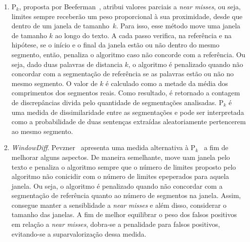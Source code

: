 \begin{enumerate}

%

\item P$_k$, proposta por Beeferman~\cite{Beeferman1999}, 
atribui valores parciais a \textit{near misses}, ou seja, limites sempre receberão um peso proporcional à sua proximidade, desde que dentro de um janela de tamanho~$k$.
%
Para isso, esse método move uma janela de tamanho $k$ ao longo do texto. 
%
A cada passo verifica, na referência e na hipótese, se o início e o final da janela estão ou não dentro do mesmo segmento,
%
então, penaliza o algoritmo caso não concorde com a referência. Ou seja, dado duas palavras de distancia $k$, o algoritmo é penalizado quando não concordar com a segmentação de referência se as palavras estão ou não no mesmo segmento.
%
O valor de $k$ é calculado como a metade da média dos comprimentos dos segmentos reais. Como resultado, é retornado a contagem de discrepâncias divida pelo quantidade de segmentações analisadas. 
%
P$_k$ é uma medida de dissimilaridade entre as segmentações e pode ser interpretada como a probabilidade de duas sentenças extraídas aleatoriamente pertencerem ao mesmo segmento.

\item \textit{WindowDiff}. Pevzner~\cite{Pevzner2002} 
%
apresenta uma medida alternativa à P$_k$~\cite{Beeferman1999} a fim de melhorar alguns aspectos. 
%
De maneira semelhante, move uam janela pelo texto e penaliza o algoritmo sempre que o número de limites proposto pelo algoritmo não conicidir com o número de limites epeperados para aquela janela. Ou seja, o algoritmo é penalizado quando não concordar com a segmentação de referência quanto ao número de segmentos na janela. 
%
Assim, consegue manter a sensiblidade a \textit{near misses} e além disso, considerar o tamanho das janelas.
%
A fim de melhor equilibrar o peso dos falsos positivos em relação a \textit{near misses}, dobra-se a penalidade para falsos positivos, evitando-se a suparvalorização dessa medida. 


\end{enumerate}







